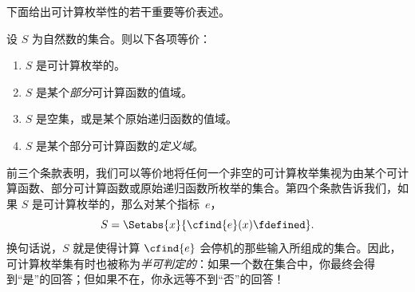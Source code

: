 \documentclass[../../../include/open-logic-section]{subfiles}
\begin{document}



下面给出可计算枚举性的若干重要等价表述。

\begin{thm}
设 $S$ 为自然数的集合。则以下各项等价：
\begin{enumerate}
\item{} $S$ 是可计算枚举的。
\item{} $S$ 是某个\emph{部分}可计算函数的值域。
\item{} $S$ 是空集，或是某个原始递归函数的值域。
\item{} $S$ 是某个部分可计算函数的\emph{定义域}。
\end{enumerate}
\end{thm}

\begin{explain}
前三个条款表明，我们可以等价地将任何一个非空的可计算枚举集视为由某个可计算函数、部分可计算函数或原始递归函数所枚举的集合。第四个条款告诉我们，如果 $S$ 是可计算枚举的，那么对某个指标~$e$，
\[
S = \Setabs{x}{\cfind{e}(x) \fdefined}.
\]
换句话说，$S$ 就是使得计算 $\cfind{e}$ 会停机的那些输入所组成的集合。因此，可计算枚举集有时也被称为\emph{半可判定的}：如果一个数在集合中，你最终会得到“是”的回答；但如果不在，你永远等不到“否”的回答！{}
\end{explain}
\end{document}
